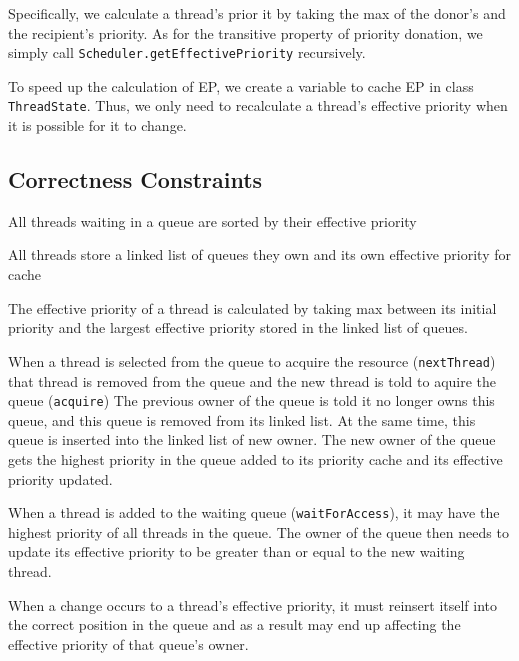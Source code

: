 \documentclass{article}
\begin{document}
\begin{spacing}{1.1}
    Specifically, we calculate a thread's prior it  by taking the max of the donor's and the recipient's priority. As for the transitive property of priority donation, we simply call \texttt{Scheduler.getEffectivePriority} recursively.

    To speed up the calculation of EP, we create a variable to cache EP in class \texttt{ThreadState}. Thus, we only need to recalculate a thread's effective priority when it is possible for it to change.

    \subsection{Correctness Constraints}

    \begin{asparaitem}
    \item All threads waiting in a queue are sorted by their effective priority\\
    \item All threads store a linked list of queues they own and its own effective priority for cache\\
    \item The effective priority of a thread is calculated by taking max between its initial priority and the largest effective priority stored in the linked list of queues.\\
    \item When a thread is selected from the queue to acquire the resource (\texttt{nextThread}) that thread is removed from the queue and the new thread is told to aquire the queue (\texttt{acquire}) The previous owner of the queue is told it no longer owns this queue, and this queue is removed from its linked list. At the same time, this queue is inserted into the linked list of new owner. The new owner of the queue gets the highest priority in the queue added to its priority cache and its effective priority updated. \\
    \item When a thread is added to the waiting queue (\texttt{waitForAccess}), it may have the highest priority of all threads in the queue. The owner of the queue then needs to update its effective priority to be greater than or equal to the new waiting thread.\\
    \item When a change occurs to a thread's effective priority, it must reinsert itself into the correct position in the queue and as a result may end up affecting the effective priority of that queue's owner.
    \end{asparaitem}


\end{spacing}
\end{document}
